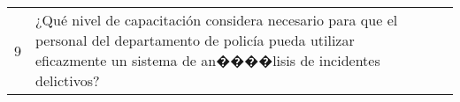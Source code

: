 \begin{longtable}{|l|p{5.9cm}|p{4cm}|p{4cm}|}
    9                                        & ¿Qué nivel de capacitación considera necesario para que el personal del departamento de policía pueda utilizar eficazmente un sistema de an����lisis de incidentes delictivos?                                                                        &                                         &                                           \\
\end{longtable}
